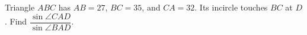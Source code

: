 Triangle $ABC$ has $AB=27$, $BC=35$, and $CA=32$. Its incircle touches $BC$ at $D$. Find $\dfrac{\sin\angle CAD}{\sin\angle BAD}$.

